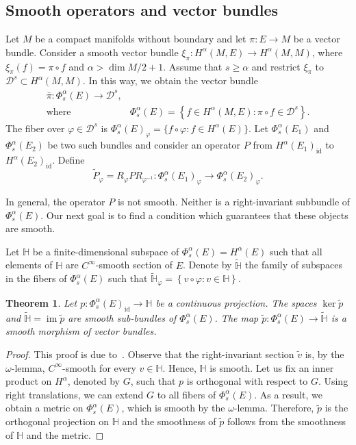 \documentclass[a5paper,10pt,twoside]{article}
\newcommand{\bbH}{\ensuremath{\mathbb{H}}}
\newcommand{\cD}{\ensuremath{\mathcal{D}}}
\DeclareMathOperator*{\id}{id}
\DeclareMathOperator*{\im}{im}
\theoremstyle{plain}
\newtheorem{teo}{Theorem}[section]
\theoremstyle{definition}
\theoremstyle{remark}
\begin{document}
\subsection{Smooth operators and vector bundles}
Let $M$ be a compact manifolds without boundary and let $\pi:E\to M$ be a vector bundle. Consider a smooth vector bundle $\xi_\pi:H^\alpha(M,E)\to H^\alpha(M,M)$, where $\xi_\pi(f)=\pi\circ f$ and $\alpha>\dim M/2 +1.$ Assume that $s\geq \alpha$ and restrict $\xi_\pi$ to $\cD^s\subset H^\alpha(M,M)$. In this way, we obtain the vector bundle
%
\begin{align}
\bar{\pi}:\Phi_s^\alpha(E)\to\cD^s,& \nonumber\\
\mathrm{where\ \ } &\Phi_s^\alpha(E)=\left\{f\in H^\alpha(M,E):\pi\circ f\in\cD^s\right\}.
\end{align}
%
The fiber over $\varphi\in \cD^s$ is $\Phi_s^\alpha(E)_\varphi=\{f\circ\varphi:f\in H^\alpha(E)\}$.
Let $\Phi_s^\alpha(E_1)$ and $\Phi_s^\alpha(E_2)$ be two such bundles and consider an operator $P$ from $H^\alpha(E_1)_{\id}$ to $H^\alpha(E_2)_{\id}$. Define
%
\begin{equation}
\tilde{P}_\varphi = R_\varphi P R_{\varphi^{-1}}: \Phi_s^\alpha(E_1)_\varphi\to \Phi_s^\alpha(E_2)_\varphi.
\end{equation}

In general, the operator $P$ is not smooth. Neither is a right-invariant subbundle
of $\Phi_s^\alpha(E)$. Our next goal is to find a condition which guarantees that
these objects are smooth.

Let $\bbH$ be a finite-dimensional subspace of $\Phi_s^\alpha(E)=H^\alpha(E)$ such that all elements of $\bbH$ are $C^\infty$-smooth section of $E$. Denote by $\tilde{\bbH}$ the family of subspaces in the fibers of $\Phi_s^\alpha(E)$ such that $\tilde{\bbH}_\varphi=\left\{v\circ\varphi:v\in\bbH \right\}.$

\begin{teo}
Let $p:\Phi_s^\alpha(E)_{\id}\to\bbH$ be a continuous projection.
The spaces $\ker \tilde{p}$ and $\tilde{\bbH}=\im \tilde{p}$ are smooth sub-bundles of $\Phi_s^\alpha(E)$. The map $\tilde{p}:\Phi_s^\alpha(E)\to\tilde{\bbH}$ is a smooth morphism of vector bundles.
\end{teo}

\begin{proof}
This proof is due to~\cite{ebin1970groups}. Observe that the right-invariant section $\tilde{v}$ is, by the $\omega$-lemma, $C^\infty$-smooth for every $v\in\bbH$. Hence, $\bbH$ is smooth. Let us fix an inner product on $H^\alpha$, denoted by $G$, such that $p$ is orthogonal with respect to $G$. Using right translations, we can extend $G$ to all fibers of $\Phi_s^\alpha(E)$. As a result, we obtain a metric on $\Phi_s^\alpha(E)$, which is smooth by the $\omega$-lemma. Therefore, $\tilde{p}$ is the orthogonal projection on $\bbH$ and the smoothness of $\tilde{p}$ follows from the smoothness of $\bbH$ and the metric.
\end{proof}
\end{document}
